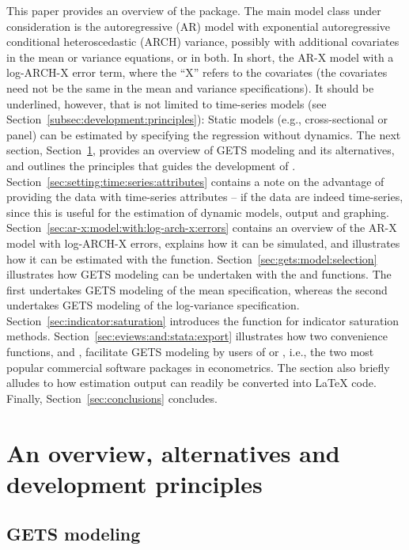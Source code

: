 \documentclass[article,nojss]{jss}
\begin{document}
This paper provides an overview of the  package. The main
model class under consideration is the autoregressive (AR) model with
exponential autoregressive conditional heteroscedastic (ARCH)
variance, possibly with additional covariates in the mean or variance
equations, or in both.  In short, the AR-X model with a log-ARCH-X
error term, where the ``X'' refers to the covariates (the covariates
need not be the same in the mean and variance specifications). It
should be underlined, however, that  is not limited to
time-series models (see Section~\ref{subsec:development:principles}):
Static models (e.g., cross-sectional or panel) can be estimated by specifying
the regression without dynamics. The next section,
Section~\ref{sec:an:overview}, provides an overview of GETS modeling
and its alternatives, and outlines the principles that guides the
development of
. Section~\ref{sec:setting:time:series:attributes} contains
a note on the advantage of providing the data with time-series
attributes -- if the data are indeed time-series, since this is useful
for the estimation of dynamic models, output and
graphing. Section~\ref{sec:ar-x:model:with:log-arch-x:errors} contains
an overview of the AR-X model with log-ARCH-X errors, explains how it
can be simulated, and illustrates how it can be estimated with the
 function. Section~\ref{sec:gets:model:selection}
illustrates how GETS modeling can be undertaken with the 
and  functions. The first undertakes GETS modeling of the
mean specification, whereas the second undertakes GETS modeling of the
log-variance specification. Section~\ref{sec:indicator:saturation}
introduces the  function for indicator saturation
methods. Section~\ref{sec:eviews:and:stata:export} illustrates how two
convenience functions,  and , facilitate GETS
modeling by users of  \citep{EViews2016v9.5} or
 \citep{STATA2017}, i.e., the two most popular
commercial software packages in econometrics. The section also briefly
alludes to how estimation output can readily be converted into
\LaTeX{} code. Finally, Section~\ref{sec:conclusions} concludes.

\section{An overview, alternatives and development principles}
\label{sec:an:overview}

\subsection{GETS modeling}
\label{subsec:gets:modeling}
\end{document}
